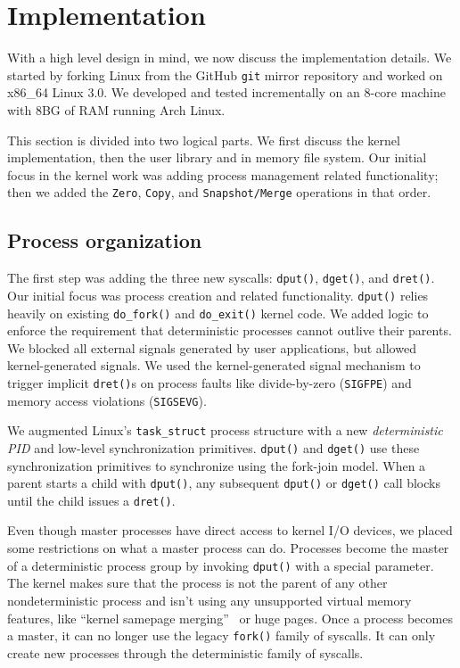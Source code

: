 
\section{Implementation}
\label{sec:impl}

With a high level design in mind, we now discuss the implementation details.
We started by forking Linux from the GitHub {\tt git} mirror repository and
worked on x86\_64 Linux 3.0. We developed and tested incrementally on an 8-core
machine with 8BG of RAM running Arch Linux.

This section is divided into two logical parts. We first discuss the kernel
implementation, then the user library and in memory file system.
Our initial focus in the kernel work was adding process management related
functionality; then we added the {\tt Zero}, {\tt Copy}, and
{\tt Snapshot/Merge} operations in that order.

\subsection{Process organization}

The first step was adding the three new syscalls: {\tt dput()}, {\tt dget()},
and {\tt dret()}. Our initial focus was process creation and related
functionality. {\tt dput()} relies heavily on existing {\tt do\_fork()} and
{\tt do\_exit()} kernel code.
We added logic to enforce the requirement that deterministic processes cannot
outlive their parents. We blocked all external signals generated by user
applications, but allowed kernel-generated signals. We used the kernel-generated
signal mechanism to trigger implicit {\tt dret()}s on process faults like
divide-by-zero ({\tt SIGFPE}) and memory access violations ({\tt SIGSEVG}).

We augmented Linux's {\tt task\_struct} process structure with a new
\emph{deterministic PID} and low-level synchronization primitives. {\tt dput()}
and {\tt dget()} use these synchronization primitives to synchronize using the
fork-join model. When a parent starts a child
with {\tt dput()}, any subsequent {\tt dput()} or {\tt dget()} call blocks until
the child issues a {\tt dret()}.

Even though master processes have direct access to kernel I/O devices, we placed
some restrictions on what a master process can do. Processes
become the master of a deterministic process group by invoking {\tt dput()} with
a special parameter. The kernel makes sure that the process is not the parent of
any other nondeterministic process and isn't using any
unsupported virtual memory features, like ``kernel samepage
merging''~\cite{arcangeli2009increasing} or huge pages. Once a process
becomes a master, it can no longer use the legacy {\tt fork()} family of
syscalls. It can only create new processes through the deterministic family
of syscalls.


